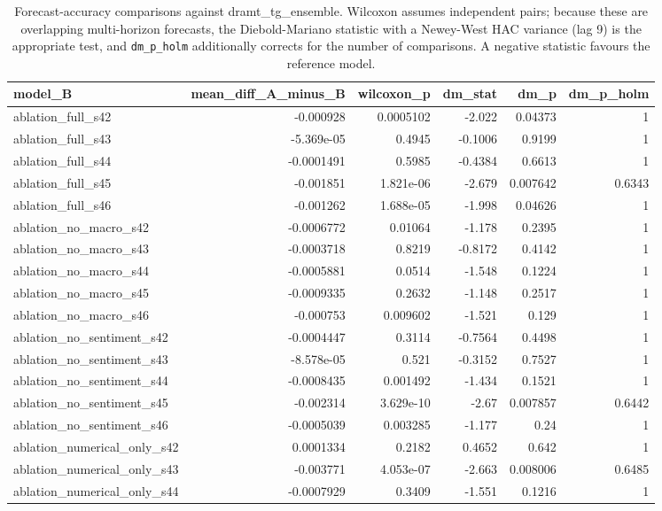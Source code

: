 \begin{table}
\caption{Forecast-accuracy comparisons against dramt_tg_ensemble. Wilcoxon assumes independent pairs; because these are overlapping multi-horizon forecasts, the Diebold-Mariano statistic with a Newey-West HAC variance (lag 9) is the appropriate test, and \texttt{dm\_p\_holm} additionally corrects for the number of comparisons. A negative statistic favours the reference model.}
\label{tab:wilcoxon}
\begin{tabular}{lrrrrr}
\toprule
model_B & mean_diff_A_minus_B & wilcoxon_p & dm_stat & dm_p & dm_p_holm \\
\midrule
ablation_full_s42 & -0.000928 & 0.0005102 & -2.022 & 0.04373 & 1 \\
ablation_full_s43 & -5.369e-05 & 0.4945 & -0.1006 & 0.9199 & 1 \\
ablation_full_s44 & -0.0001491 & 0.5985 & -0.4384 & 0.6613 & 1 \\
ablation_full_s45 & -0.001851 & 1.821e-06 & -2.679 & 0.007642 & 0.6343 \\
ablation_full_s46 & -0.001262 & 1.688e-05 & -1.998 & 0.04626 & 1 \\
ablation_no_macro_s42 & -0.0006772 & 0.01064 & -1.178 & 0.2395 & 1 \\
ablation_no_macro_s43 & -0.0003718 & 0.8219 & -0.8172 & 0.4142 & 1 \\
ablation_no_macro_s44 & -0.0005881 & 0.0514 & -1.548 & 0.1224 & 1 \\
ablation_no_macro_s45 & -0.0009335 & 0.2632 & -1.148 & 0.2517 & 1 \\
ablation_no_macro_s46 & -0.000753 & 0.009602 & -1.521 & 0.129 & 1 \\
ablation_no_sentiment_s42 & -0.0004447 & 0.3114 & -0.7564 & 0.4498 & 1 \\
ablation_no_sentiment_s43 & -8.578e-05 & 0.521 & -0.3152 & 0.7527 & 1 \\
ablation_no_sentiment_s44 & -0.0008435 & 0.001492 & -1.434 & 0.1521 & 1 \\
ablation_no_sentiment_s45 & -0.002314 & 3.629e-10 & -2.67 & 0.007857 & 0.6442 \\
ablation_no_sentiment_s46 & -0.0005039 & 0.003285 & -1.177 & 0.24 & 1 \\
ablation_numerical_only_s42 & 0.0001334 & 0.2182 & 0.4652 & 0.642 & 1 \\
ablation_numerical_only_s43 & -0.003771 & 4.053e-07 & -2.663 & 0.008006 & 0.6485 \\
ablation_numerical_only_s44 & -0.0007929 & 0.3409 & -1.551 & 0.1216 & 1 \\

\end{tabular}
\end{table}

